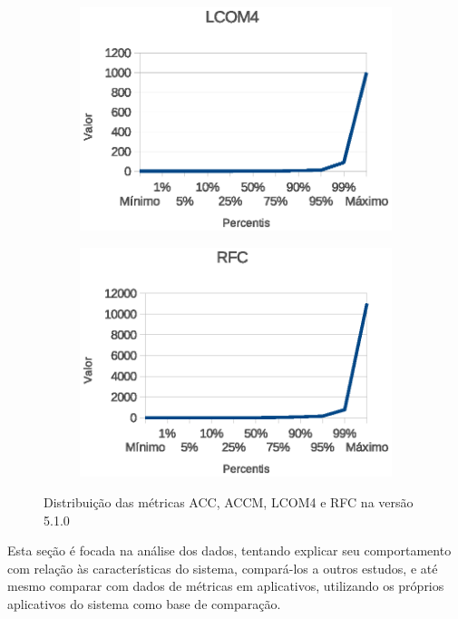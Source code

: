 \begin{figure}
\begin{subfigure}[b]{0.475\textwidth}
            \includegraphics[width=\textwidth]{figuras/dist/lcom4.eps}
        \end{subfigure}
        \quad
        \begin{subfigure}[b]{0.475\textwidth}   
            \centering 
            \includegraphics[width=\textwidth]{figuras/dist/rfc.eps}
        \end{subfigure}
        \caption[]
        {\small Distribuição das métricas ACC, ACCM, LCOM4 e RFC na versão 5.1.0} 
 \label{fig:android510dist}
    \end{figure}


Esta seção é focada na análise dos dados, tentando explicar seu comportamento com relação às características do sistema, compará-los a outros estudos, e até mesmo comparar com dados de métricas em aplicativos, utilizando os próprios aplicativos do sistema como base de comparação.

